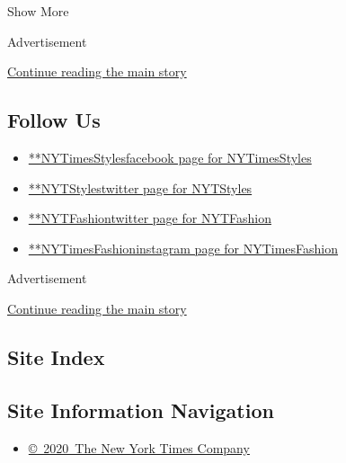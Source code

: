 Show More

Advertisement

\protect\hyperlink{after-mid7}{Continue reading the main story}

\hypertarget{follow-us}{%
\subsection{Follow Us}\label{follow-us}}

\begin{itemize}
\tightlist
\item
  \href{https://www.facebookcorewwwi.onion/NYTimesStyles}{**NYTimesStylesfacebook
  page for NYTimesStyles}
\item
  \href{https://twitter.com/NYTStyles}{**NYTStylestwitter page for
  NYTStyles}
\item
  \href{https://twitter.com/NYTFashion}{**NYTFashiontwitter page for
  NYTFashion}
\item
  \href{https://instagram.com/NYTimesFashion}{**NYTimesFashioninstagram
  page for NYTimesFashion}
\end{itemize}

Advertisement

\protect\hyperlink{after-mktg}{Continue reading the main story}

\hypertarget{site-index}{%
\subsection{Site Index}\label{site-index}}

\hypertarget{site-information-navigation}{%
\subsection{Site Information
Navigation}\label{site-information-navigation}}

\begin{itemize}
\tightlist
\item
  \href{https://help.nytimes3xbfgragh.onion/hc/en-us/articles/115014792127-Copyright-notice}{©~2020~The
  New York Times Company}
\end{itemize}

